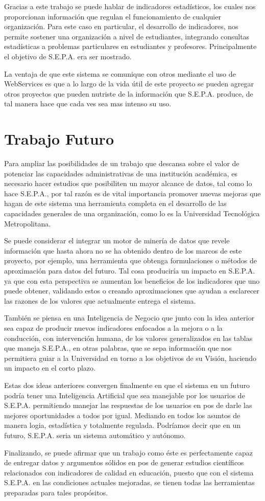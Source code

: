 \documentclass[a4paper,12pt,openany,oneside]{book}
\begin{document}
Gracias a este trabajo se puede hablar de indicadores estadísticos, los cuales nos proporcionan información que regulan el funcionamiento de cualquier organización. Para este caso en particular, el desarrollo de indicadores, nos permite sostener una organización a nivel de estudiantes, integrando consultas estadísticas a problemas particulares en estudiantes y profesores. Principalmente el objetivo de S.E.P.A. era ser mostrado.

La ventaja de que este sistema se comunique con otros mediante el uso de WebServices es que a lo largo de la vida útil de este proyecto se pueden agregar otros proyectos que pueden nutriste de la información que S.E.P.A. produce, de tal manera hace que cada ves sea mas intenso su uso.
\section{Trabajo Futuro}
Para ampliar las posibilidades de un trabajo que descansa sobre el valor de potenciar las capacidades administrativas de una institución académica, es necesario hacer estudios que posibiliten un mayor alcance de datos, tal como lo hace S.E.P.A., por tal razón es de vital importancia promover nuevas mejoras que hagan de este sistema una herramienta completa en el desarrollo de las capacidades generales de una organización, como lo es la Universidad Tecnológica Metropolitana.

Se puede considerar el integrar un motor de minería de datos que revele información que hasta ahora no se ha obtenido dentro de los marcos de este proyecto, por ejemplo, una herramienta que obtenga formulaciones o métodos de aproximación para datos del futuro. Tal cosa produciría un impacto en S.E.P.A. ya que con esta perspectiva se aumentan los beneficios de los indicadores que uno puede obtener, validando estos o creando aproximaciones que ayudan a esclarecer las razones de los valores que actualmente entrega el sistema.

También se piensa en una Inteligencia de Negocio que junto con la idea anterior sea capaz de producir nuevos indicadores enfocados a la mejora o a la conducción, con intervención humana, de los valores generalizados en las tablas que maneja S.E.P.A., en otras palabras, que se sepa información que nos permitiera guiar a la Universidad en torno a los objetivos de su Visión, haciendo un impacto en el corto plazo.

Estas dos ideas anteriores convergen finalmente en que el sistema en un futuro podría tener una Inteligencia Artificial que sea manejable por los usuarios de S.E.P.A. permitiendo manejar las respuestas de los usuarios en pos de darle las mejores oportunidades a todos por igual. Mediando en todos los asuntos de manera logia, estadística y totalmente regulada. Podríamos decir que en un futuro, S.E.P.A. seria un sistema automático y autónomo.

Finalizando, se puede afirmar que un trabajo como éste es perfectamente capaz de entregar datos y argumentos sólidos en pos de generar estudios científicos relacionados con indicadores de calidad en educación, puesto que con el sistema S.E.P.A. en las condiciones actuales mejoradas, se tienen todas las herramientas preparadas para tales propósitos. 


\end{document}
